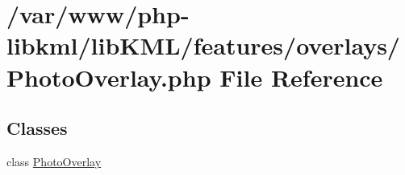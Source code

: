 \hypertarget{PhotoOverlay_8php}{
\section{/var/www/php-\/libkml/libKML/features/overlays/PhotoOverlay.php File Reference}
\label{d5/df9/PhotoOverlay_8php}
}
\subsection*{Classes}
\begin{DoxyCompactItemize}
\item 
class \hyperlink{classPhotoOverlay}{PhotoOverlay}
\end{DoxyCompactItemize}
